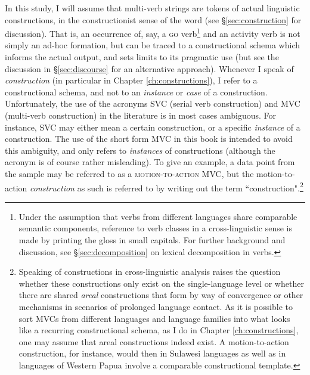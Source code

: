 In this study, I will assume that multi-verb strings are tokens of actual linguistic constructions, in the constructionist sense of the word (see §\ref{sec:construction} for discussion). That is, an occurrence of, say, a \textsc{go} verb\footnote{Under the assumption that verbs from different languages share comparable semantic components, reference to verb classes in a cross-linguistic sense is made by printing the gloss in small capitals. For further background and discussion, see §\ref{sec:decomposition} on lexical decomposition in verbs.} and an activity verb is not simply an ad-hoc formation, but can be traced to a constructional schema which informs the actual output, and sets limits to its pragmatic use (but see the discussion in §\ref{sec:discourse} for an alternative approach). Whenever I speak of \textit{construction} (in particular in Chapter \ref{ch:constructions}), I refer to a constructional schema, and not to an \emph{instance} or \emph{case} of a construction. Unfortunately, the use of the acronyms SVC (serial verb construction) and MVC (multi-verb construction) in the literature is in most cases ambiguous. For instance, SVC may either mean a certain construction, or a specific \emph{instance} of a construction. The use of the short form MVC in this book is intended to avoid this ambiguity, and only refers to \emph{instances} of constructions (although the acronym is of course rather misleading). To give an example, a data point from the sample may be referred to as a \textsc{motion-to-action} MVC, but the motion-to-action \emph{construction} as such is referred to by writing out the term ``construction".\footnote{Speaking of constructions in cross-linguistic analysis raises the question whether these constructions only exist on the single-language level or whether there are shared \emph{areal} constructions that form by way of convergence or other mechanisms in scenarios of prolonged language contact. As it is possible to sort MVCs from different languages and language families into what looks like a recurring constructional schema, as I do in Chapter \ref{ch:constructions}, one may assume that areal constructions indeed exist. A motion-to-action construction, for instance, would then in Sulawesi languages as well as in languages of Western Papua involve a comparable constructional template.} 

